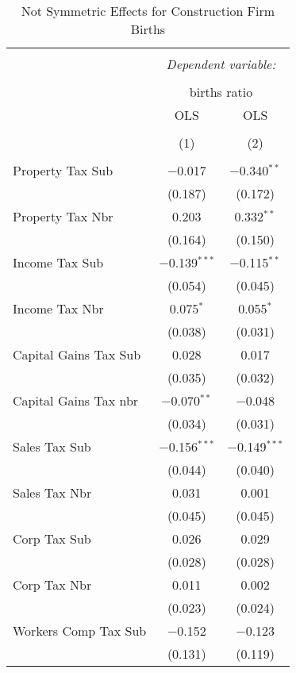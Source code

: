 
\begin{table}[!htbp] \centering 
  \caption{Not Symmetric Effects for  Construction Firm Births} 
  \label{23noequality} 
\begin{tabular}{@{\extracolsep{5pt}}lcc} 
\\[-1.8ex]\hline 
\hline \\[-1.8ex] 
 & \multicolumn{2}{c}{\textit{Dependent variable:}} \\ 
\cline{2-3} 
\\[-1.8ex] & \multicolumn{2}{c}{births ratio} \\ 
 & OLS & OLS \\ 
\\[-1.8ex] & (1) & (2)\\ 
\hline \\[-1.8ex] 
 Property Tax Sub & $-$0.017 & $-$0.340$^{**}$ \\ 
  & (0.187) & (0.172) \\ 
  Property Tax Nbr & 0.203 & 0.332$^{**}$ \\ 
  & (0.164) & (0.150) \\ 
  Income Tax Sub & $-$0.139$^{***}$ & $-$0.115$^{**}$ \\ 
  & (0.054) & (0.045) \\ 
  Income Tax Nbr & 0.075$^{*}$ & 0.055$^{*}$ \\ 
  & (0.038) & (0.031) \\ 
  Capital Gains Tax Sub & 0.028 & 0.017 \\ 
  & (0.035) & (0.032) \\ 
  Capital Gains Tax nbr & $-$0.070$^{**}$ & $-$0.048 \\ 
  & (0.034) & (0.031) \\ 
  Sales Tax Sub & $-$0.156$^{***}$ & $-$0.149$^{***}$ \\ 
  & (0.044) & (0.040) \\ 
  Sales Tax Nbr & 0.031 & 0.001 \\ 
  & (0.045) & (0.045) \\ 
  Corp Tax Sub & 0.026 & 0.029 \\ 
  & (0.028) & (0.028) \\ 
  Corp Tax Nbr & 0.011 & 0.002 \\ 
  & (0.023) & (0.024) \\ 
  Workers Comp Tax Sub & $-$0.152 & $-$0.123 \\ 
  & (0.131) & (0.119) \\ 

\end{tabular}
\end{table}
